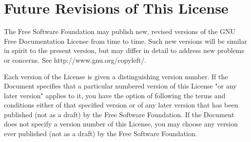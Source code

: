 \documentclass[oneside,a4paper]{book}
\begin{document}
\section{Future Revisions of This License}

The Free Software Foundation may publish new, revised versions
of the GNU Free Documentation License from time to time.  Such new
versions will be similar in spirit to the present version, but may
differ in detail to address new problems or concerns. See
http://www.gnu.org/copyleft/.

Each version of the License is given a distinguishing version number.
If the Document specifies that a particular numbered version of this
License "or any later version" applies to it, you have the option of
following the terms and conditions either of that specified version or
of any later version that has been published (not as a draft) by the
Free Software Foundation.  If the Document does not specify a version
number of this License, you may choose any version ever published (not
as a draft) by the Free Software Foundation.
\end{document}

